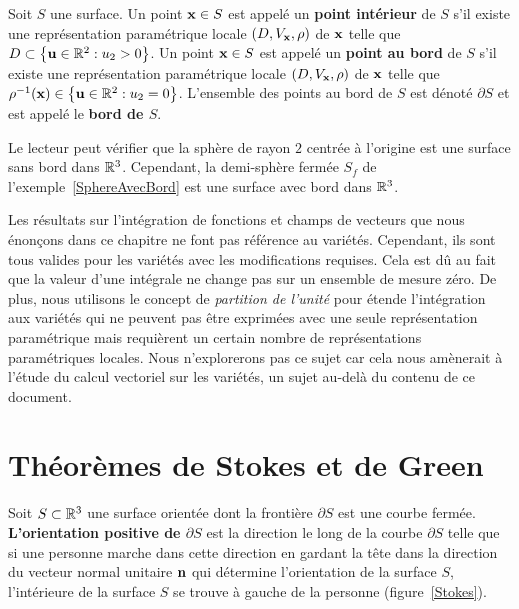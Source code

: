 {


Soit $S$ une surface.  Un point $\mathbf{x} \in S$ est appelé un
{\bfseries point intérieur} de $S$ s'il existe une
représentation paramétrique locale $(D,V_{\mathbf{x}},\rho)$ de $\mathbf{x}$
telle que $D \subset \left\{ \mathbf{u} \in \mathbb{R}^2 : u_2 > 0 \right\}$.
Un point $\mathbf{x} \in S$ est appelé un
{\bfseries point au bord} de $S$ s'il existe une
représentation paramétrique locale $(D,V_{\mathbf{x}},\rho)$ de $\mathbf{x}$
telle que
$\rho^{-1}(\mathbf{x}) \in \left\{ \mathbf{u} \in \mathbb{R}^2 : u_2 = 0 \right\}$.
L'ensemble des points au bord de $S$ est dénoté $\partial S$ et est
appelé le {\bfseries bord de $S$}.

Le lecteur peut vérifier que la sphère de rayon $2$ centrée à
l'origine est une surface sans bord dans $\mathbb{R}^3$.  Cependant, la
demi-sphère fermée $S_f$ de l'exemple~\ref{SphereAvecBord}
est une surface avec bord dans $\mathbb{R}^3$.

Les résultats sur l'intégration de fonctions et champs de vecteurs que
nous énonçons dans ce chapitre ne font pas référence au variétés.
Cependant, ils sont tous valides pour les variétés avec les
modifications requises.  Cela est dû au fait que la valeur d'une
intégrale ne change pas sur un ensemble de \lgm mesure zéro\rgm.  De
plus, nous utilisons le concept de {\em partition de l'unité} pour étende
l'intégration aux variétés qui ne peuvent pas être exprimées avec une
seule représentation paramétrique mais requièrent un certain nombre de
représentations paramétriques locales.  Nous n'explorerons pas ce
sujet car cela nous amènerait à l'étude du calcul vectoriel sur les
variétés, un sujet au-delà du contenu de ce document.

\section{Théorèmes de Stokes et de Green}

Soit $S \subset \mathbb{R}^3$ une surface orientée dont la frontière
$\partial S$ est une courbe fermée.  {\bfseries L'orientation positive
de $\partial S$} est la direction le long de la courbe $\partial S$
telle que si une personne marche dans cette direction en gardant la
tête dans la direction du vecteur normal unitaire $\mathbf{n}$ qui
détermine l'orientation de la surface $S$, l'intérieure de la surface
$S$ se trouve à gauche de la personne (figure~\ref{Stokes}).

}
